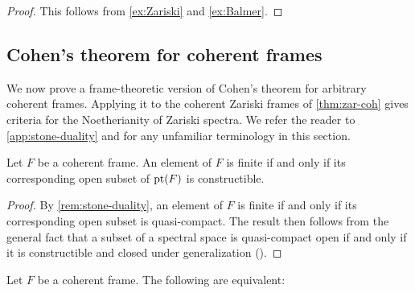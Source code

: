 \documentclass[10pt,a4paper,oneside]{article}
\begin{document}
\begin{proof}
This follows from \cref{ex:Zariski} and \cref{ex:Balmer}.
\end{proof}


\subsection{Cohen's theorem for coherent frames}
We now prove a frame-theoretic version of Cohen’s theorem for arbitrary coherent frames. Applying it to the coherent Zariski frames of \cref{thm:zar-coh} gives criteria for the Noetherianity of Zariski spectra. We refer the reader to \cref{app:stone-duality} and \cite{DickmannSchwartzTressl19} for any unfamiliar terminology in this section.

\begin{lem}\label{lem:cohen}
Let $F$ be a coherent frame. An element of $F$ is finite if and only if its corresponding open subset of $\operatorname{pt}(F)$ is constructible.
\end{lem}
\begin{proof}
By \cref{rem:stone-duality}, an element of $F$ is finite if and only if its corresponding open subset is quasi-compact. The result then follows from the general fact that a subset of a spectral space is quasi-compact open if and only if it is constructible and closed under generalization (\cite[Theorem~1.5.4(iii)]{DickmannSchwartzTressl19}).
\end{proof}

\begin{thm}\label{thm:cohen}
Let $F$ be a coherent frame. The following are equivalent:
\end{thm}
\end{document}
